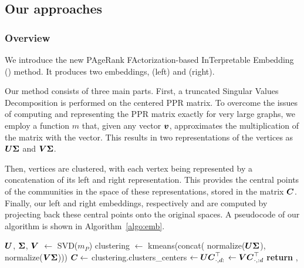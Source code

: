 
\subsection{Our approaches}\label{sec:approach}
\subsubsection{Overview} \label{subsec:overview}
We introduce the new PAgeRank FActorization-based InTerpretable Embedding (\parfaite) method. It produces two embeddings, \newembLeft (left) and \newembRight (right).

Our method consists of three main parts. First, a truncated Singular Values Decomposition is performed on the centered PPR matrix. To overcome the issues of computing and representing the PPR matrix exactly for very large graphs, we employ a function $m$ that, given any vector $\boldsymbol{v}$, approximates the multiplication of the matrix with the vector. This results in two representations of the vertices as $\boldsymbol{U}\boldsymbol{\Sigma}$ and $\boldsymbol{V}\boldsymbol{\Sigma}$.

Then, vertices are clustered, with each vertex being represented by a concatenation of its left and right representation. This provides the central points of the communities in the space of these representations, stored in the matrix $\boldsymbol{C}$. Finally, our left and right embeddings, respectively \newembLeft and \newembRight are computed by projecting back these central points onto the original spaces. A pseudocode of our algorithm is shown in Algorithm~\ref{algo:emb}. 

\begin{algorithm}
    \caption{\parfaite}\label{algo:emb}
    \begin{algorithmic}[1]
    \State $\boldsymbol{U}$, $\boldsymbol{\Sigma}$, $\boldsymbol{V}$ $\gets$ SVD($m_P$)
    \State clustering $\gets$ kmeans(concat( normalize($\boldsymbol{U}\boldsymbol{\Sigma}$), normalize($\boldsymbol{V}\boldsymbol{\Sigma}$)))
    \State $\boldsymbol{C} \gets$ clustering.clusters\_centers
    \State \newembLeft $ \gets \boldsymbol{U}\boldsymbol{C}_{\cdot, d:}^\top$
    \State\newembRight $ \gets \boldsymbol{V}\boldsymbol{C}_{\cdot, :d}^\top$
    \State \textbf{return} \newembLeft, \newembRight
    \EndProcedure
    \end{algorithmic}
\end{algorithm}

